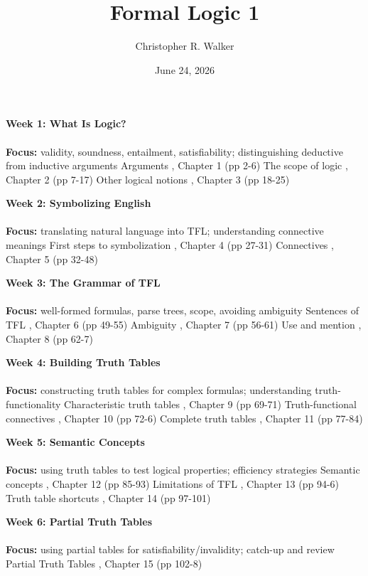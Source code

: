 \documentclass{article}
\title{Formal Logic 1}
\author{Christopher R. Walker}
\date{June 24, 2026}
\begin{document}
\maketitle

\begin{outline}[enumerate]

\1 \textbf{Week 1: What Is Logic?}
\\
\\
\textbf{Focus:}
validity, soundness, entailment, satisfiability;
distinguishing deductive from inductive arguments
\2 Arguments \3 \cite{Mag25},  Chapter 1 (pp 2-6)
\2 The scope of logic \3  \cite{Mag25},  Chapter 2 (pp 7-17)
\2 Other logical notions \3 \cite{Mag25},  Chapter 3 (pp 18-25)

\1 \textbf{Week 2: Symbolizing English}
\\
\\
\textbf{Focus:}
translating natural language into TFL;
understanding connective meanings
\2 First steps to symbolization \3 \cite{Mag25},  Chapter 4 (pp 27-31)
\2 Connectives \3 \cite{Mag25},  Chapter 5 (pp 32-48)

\1 \textbf{Week 3: The Grammar of TFL}
\\
\\
\textbf{Focus:}
well-formed formulas, parse trees, scope, avoiding ambiguity
\2 Sentences of TFL \3 \cite{Mag25},  Chapter 6 (pp 49-55)
\2 Ambiguity \3 \cite{Mag25},  Chapter 7 (pp 56-61)
\2 Use and mention  \3 \cite{Mag25},  Chapter 8 (pp 62-7)

\1 \textbf{Week 4: Building Truth Tables}
\\
\\
\textbf{Focus:}
constructing truth tables for complex formulas;
understanding truth-functionality
\2 Characteristic truth tables \3 \cite{Mag25},  Chapter 9 (pp 69-71)
\2 Truth-functional connectives  \3 \cite{Mag25},  Chapter 10 (pp 72-6)
\2 Complete truth tables \3 \cite{Mag25},  Chapter 11 (pp 77-84)

\1 \textbf{Week 5: Semantic Concepts}
\\
\\
\textbf{Focus:}
using truth tables to test logical properties;
efficiency strategies
\2 Semantic concepts \3 \cite{Mag25},  Chapter 12 (pp 85-93)
\2 Limitations of TFL \3 \cite{Mag25},  Chapter 13 (pp 94-6)
\2 Truth table shortcuts \3 \cite{Mag25},  Chapter 14 (pp 97-101)

\1 \textbf{Week 6: Partial Truth Tables}
\\
\\
\textbf{Focus:}
using partial tables for satisfiability/invalidity;
catch-up and review
\2 Partial Truth Tables \3 \cite{Mag25},  Chapter 15 (pp 102-8)


\end{outline}
\end{document}
